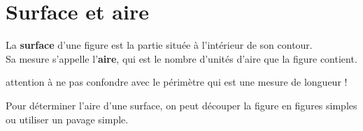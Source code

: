 \section{Surface et aire}

\begin{definition}
   La \textbf{surface} d'une figure est la partie située à l'intérieur de son contour. \\
   Sa mesure s'appelle l'\textbf{aire}, qui est le nombre d'unités d'aire que la figure contient.
\end{definition}

\begin{remarque}
   attention à ne pas confondre avec le périmètre qui est une mesure de longueur !
\end{remarque}

Pour déterminer l'aire d'une surface, on peut découper la figure en figures simples ou utiliser un pavage simple.

